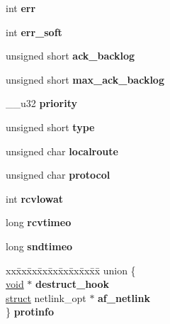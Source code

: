 \begin{DoxyCompactItemize}
\begin{tabbing}
\end{tabbing}\item 
\mbox{\label{structsock_a485e0ce37e6b29b31ce271a4ec87d37f}} 
int {\bfseries err}
\item 
\mbox{\label{structsock_a0925f453e6c55e4ed9615bc559201a16}} 
int {\bfseries err\+\_\+soft}
\item 
\mbox{\label{structsock_a6ef5f983bba4a2aef234115317f0c98e}} 
unsigned short {\bfseries ack\+\_\+backlog}
\item 
\mbox{\label{structsock_acb5565c6402f58bd44b77cd2f8d96970}} 
unsigned short {\bfseries max\+\_\+ack\+\_\+backlog}
\item 
\mbox{\label{structsock_ada64603e9c12d8cf4178e126efc8a986}} 
\+\_\+\+\_\+u32 {\bfseries priority}
\item 
\mbox{\label{structsock_afb7fe254bc4082d526c1ff349dfc558e}} 
unsigned short {\bfseries type}
\item 
\mbox{\label{structsock_a6925636883780bca2a37bf489e5ae2da}} 
unsigned char {\bfseries localroute}
\item 
\mbox{\label{structsock_aaa37c23080b5fdc663833a4860d0183c}} 
unsigned char {\bfseries protocol}
\item 
\mbox{\label{structsock_aed316c75be9586a03696292da92c75da}} 
int {\bfseries rcvlowat}
\item 
\mbox{\label{structsock_a95d761acbf3fd677e774778f83b41e1f}} 
long {\bfseries rcvtimeo}
\item 
\mbox{\label{structsock_a4b8949e7ec6cce9acf04982aeef154d2}} 
long {\bfseries sndtimeo}
\item 
\mbox{\label{structsock_a1bd4b28fa8ef3a72d73475e2e832b248}} 
\begin{tabbing}
xx\=xx\=xx\=xx\=xx\=xx\=xx\=xx\=xx\=\kill
union \{\\
\>\hyperlink{interfacevoid}{void} $\ast$ {\bfseries destruct\_hook}\\
\>\hyperlink{interfacestruct}{struct} netlink\_opt $\ast$ {\bfseries af\_netlink}\\
\} {\bfseries protinfo}\\


\end{tabbing}
\end{DoxyCompactItemize}
